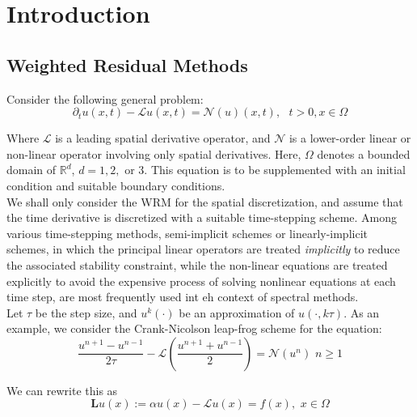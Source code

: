 \section{Introduction}

\subsection{Weighted Residual Methods}

Consider the following general problem:
\begin{equation}
	\partial_t u(x,t) -  \mathcal{L} u (x,t) =  \mathcal{N}(u)(x,t),  \hspace{8pt} t>0, x \in  \Omega
\end{equation}

Where $ \mathcal{L} $ is a leading spatial derivative operator, and $ \mathcal{N} $ is a lower-order linear or non-linear operator involving only spatial derivatives. Here, $ \Omega $ denotes a bounded domain of $ \mathbb{R}^d $, $ d=1,2, \text{ or } 3 $. This equation is to be supplemented with an initial condition and suitable boundary conditions. \\
\indent We shall only consider the WRM for the spatial discretization, and assume that the time derivative is discretized with a suitable time-stepping scheme. Among various time-stepping methods, semi-implicit schemes or linearly-implicit schemes, in which the principal linear operators are treated \textit{implicitly} to reduce the associated stability constraint, while the non-linear equations are treated explicitly to avoid the expensive process of solving nonlinear equations at each time step, are most frequently used int eh context of spectral methods. \\
\indent Let $ \tau $ be the step size, and $ u^k(\cdot) $ be an approximation of $ u(\cdot ,k \tau) $. As an example, we consider the Crank-Nicolson leap-frog scheme for the equation:
\begin{equation}
	\frac{u^{ n+1 } - u^{ n-1 }}{2 \tau} - \mathcal{L}\left( \frac{u^{ n+1 } + u^{ n-1 }}{2}  \right) =  \mathcal{N}\left( u^{ n } \right) \hspace{4pt} n \geq 1
\end{equation}

We can rewrite this as
\begin{equation}
	\mathbf{L}u(x) := \alpha u(x) - \mathcal{L}u(x) = f(x), \hspace{4pt} x \in \Omega
\end{equation}

